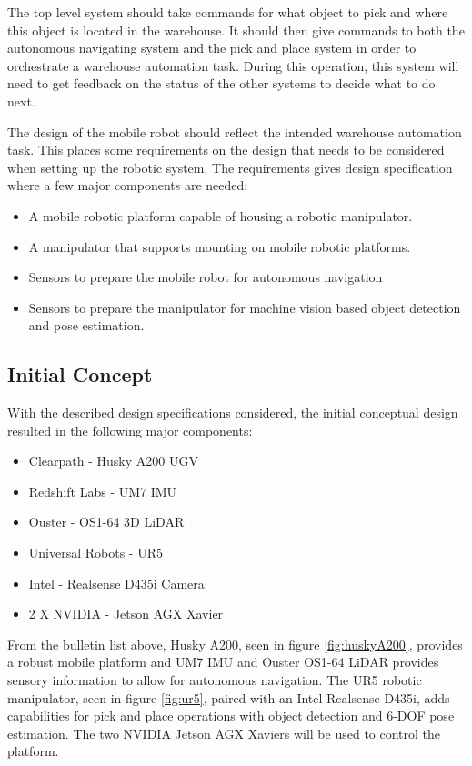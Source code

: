 The top level system should take commands for what object to pick and where this object is located in the warehouse. It should then give commands to both the autonomous navigating system and the pick and place system in order to orchestrate a warehouse automation task. During this operation, this system will need to get feedback on the status of the other systems to decide what to do next.



The design of the mobile robot should reflect the intended warehouse automation task. This places some requirements on the design that needs to be considered when setting up the robotic system. The requirements gives design specification where a few major components are needed:

\begin{itemize}
    \item A mobile robotic platform capable of housing a robotic manipulator.
    \item A manipulator that supports mounting on mobile robotic platforms.
    \item Sensors to prepare the mobile robot for autonomous navigation
    \item Sensors to prepare the manipulator for machine vision based object detection and pose estimation.
\end{itemize}

\subsection{Initial Concept} \label{sec:M:CD:InitialConcept}
With the described design specifications considered, the initial conceptual design resulted in the following major components:

\begin{itemize}
    \item Clearpath - Husky A200 UGV
    \item Redshift Labs - UM7 IMU
    \item Ouster -  OS1-64 3D LiDAR
    \item Universal Robots - UR5
    \item Intel - Realsense D435i Camera
    \item 2 X NVIDIA - Jetson AGX Xavier
\end{itemize}

From the bulletin list above, Husky A200, seen in figure \ref{fig:huskyA200}, provides a robust mobile platform and UM7 IMU and Ouster OS1-64 LiDAR provides sensory information to allow for autonomous navigation. The UR5 robotic manipulator, seen in figure \ref{fig:ur5}, paired with an Intel Realsense D435i, adds capabilities for pick and place operations with object detection and 6-DOF pose estimation. The two NVIDIA Jetson AGX Xaviers will be used to control the platform.

